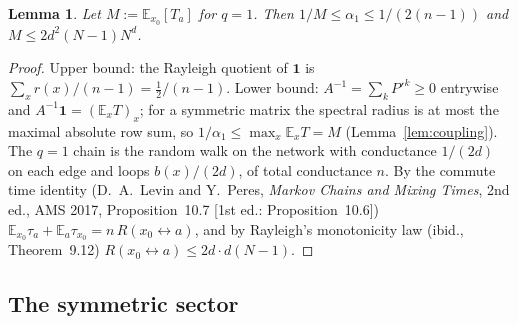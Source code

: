 \documentclass[11pt,a4paper]{article}
\newtheorem{lemma}[theorem]{Lemma}
\theoremstyle{definition}
\newcommand{\one}{\mathbf 1}
\newcommand{\E}{\mathbb E}
\begin{document}
\begin{lemma}\label{lem:alpha}
Let $M:=\E_{x_0}[T_a]$ for $q=1$. Then $1/M\le\alpha_1\le1/(2(n-1))$ and $M\le2d^2(N-1)N^d$.
\end{lemma}
\begin{proof}
Upper bound: the Rayleigh quotient of $\one$ is $\sum_xr(x)/(n-1)=\frac12/(n-1)$. Lower bound: $A^{-1}=\sum_kP'^k\ge0$ entrywise and $A^{-1}\one=(\E_xT)_x$; for a symmetric matrix the spectral radius is at most the maximal absolute row sum, so $1/\alpha_1\le\max_x\E_xT=M$ (Lemma~\ref{lem:coupling}). The $q=1$ chain is the random walk on the network with conductance $1/(2d)$ on each edge and loops $b(x)/(2d)$, of total conductance $n$. By the commute time identity (D.~A.~Levin and Y.~Peres, \emph{Markov Chains and Mixing Times}, 2nd ed., AMS 2017, Proposition~10.7 [1st ed.: Proposition~10.6]) $\E_{x_0}\tau_a+\E_a\tau_{x_0}=n\,R(x_0\leftrightarrow a)$, and by Rayleigh's monotonicity law (ibid., Theorem~9.12) $R(x_0\leftrightarrow a)\le2d\cdot d(N-1)$.
\end{proof}

\subsection{The symmetric sector}
\end{document}
